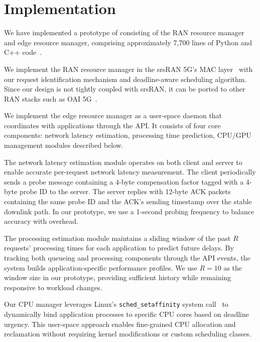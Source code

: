 \section{Implementation}
\label{sec:impl}

We have implemented a prototype of \sys{} consisting of the RAN resource manager and edge resource manager, comprising approximately 7,700 lines of Python and C++ code~\cite{smec-github}.

We implement the RAN resource manager in the srsRAN 5G's MAC layer~\cite{srsran} with our request identification mechanism and deadline-aware scheduling algorithm.
Since our design is not tightly coupled with srsRAN, it can be ported to other RAN stacks such as OAI 5G~\cite{oai5g:www}.

We implement the edge resource manager as a user-space daemon that coordinates with applications through the \sys{} API.
It consists of four core components: network latency estimation, processing time prediction, CPU/GPU management modules described below.

The network latency estimation module operates on both client and server to enable accurate per-request network latency measurement.
The client periodically sends a probe message containing a 4-byte compensation factor tagged with a 4-byte probe ID to the server.
The server replies with 12-byte ACK packets containing the same probe ID and the ACK's sending timestamp over the stable downlink path.
In our prototype, we use a 1-second probing frequency to balance accuracy with overhead.

The processing estimation module maintains a sliding window of the past $R$ requests' processing times for each application to predict future delays.
By tracking both queueing and processing components through the \sys{} API events, the system builds application-specific performance profiles.
We use $R=10$ as the window size in our prototype, providing sufficient history while remaining responsive to workload changes.

Our CPU manager leverages Linux's \texttt{sched\_setaffinity} system call~\cite{sched-setaffinity:manpage} to dynamically bind application processes to specific CPU cores based on deadline urgency.
This user-space approach enables fine-grained CPU allocation and reclamation without requiring kernel modifications or custom scheduling classes. 

